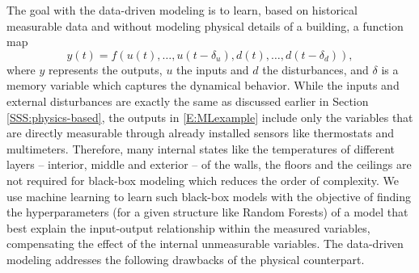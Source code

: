 \textcolor[rgb]{0,0,1}{The goal with the data-driven modeling is to learn, based on historical measurable data and without modeling physical details of a building, a function map
\begin{equation}\label{E:MLexample}
	y(t) = f(u(t),\dots,u(t-\delta_u), d(t),\dots, d(t-\delta_d)),
\end{equation}
where \(y\) represents the outputs, \(u\) the inputs and \(d\) the disturbances, and \(\delta\) is a memory variable which captures the dynamical behavior.
While the inputs and external disturbances are exactly the same as discussed earlier in Section \ref{SSS:physics-based}, the outputs in \eqref{E:MLexample} include only the variables that are directly measurable through already installed sensors like thermostats and multimeters.
Therefore, many internal states like the temperatures of different layers -- interior, middle and exterior -- of the walls, the floors and the ceilings are not required for black-box modeling which reduces the order of complexity.
We use machine learning to learn such black-box models with the objective of finding the hyperparameters (for a given structure like Random Forests) of a model that best explain the input-output relationship within the measured variables, compensating the effect of the internal unmeasurable variables. The data-driven modeling addresses the following drawbacks of the physical counterpart.}
